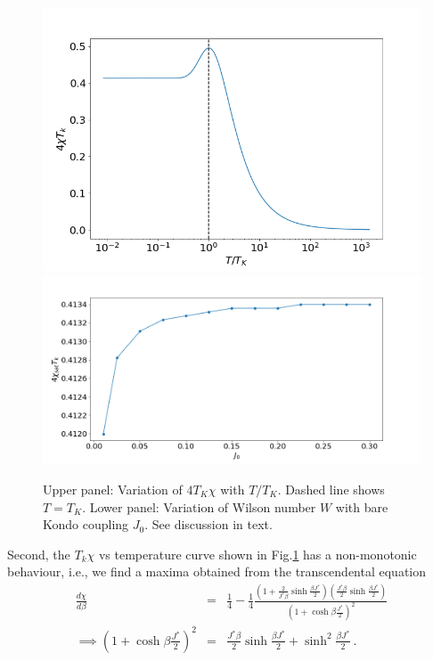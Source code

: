\documentclass[aps,prb,preprint,groupedaddress]{revtex4-2}
\begin{document}
\begin{figure}[ht!]
\includegraphics[scale=0.5]{SusceptibilityVsTemp1.png}
\includegraphics[scale=0.5]{WilsonNumber.png}
\caption{Upper panel: Variation of $4T_{K}\chi$ with $T/T_{K}$. Dashed line shows $T=T_{K}$. Lower panel: Variation of Wilson number $W$ with bare Kondo coupling $J_{0}$. See discussion in text.}\label{suscfig1}
\end{figure}
\par\noindent
Second, the $T_{k}\chi$ vs temperature curve shown in Fig.\ref{suscfig1} has a non-monotonic behaviour, i.e., we find a maxima obtained from the transcendental equation 
\begin{eqnarray}
\frac{d\chi}{d\beta}&=&\frac{1}{4}-\frac{1}{4}\frac{(1+\frac{2}{J^{*}\beta}\sinh\frac{\beta J^{*}}{2})(\frac{J^{*}\beta}{2}\sinh\frac{\beta J^{*}}{2})}{(1+\cosh\beta\frac{J^{*}}{2})^{2}}\nonumber\\ 
\implies (1+\cosh\beta\frac{J^{*}}{2})^{2}&=&\frac{J^{*}\beta}{2}\sinh\frac{\beta J^{*}}{2}+\sinh^{2}\frac{\beta J^{*}}{2}~.~~~~~
\end{eqnarray} 
\end{document}

